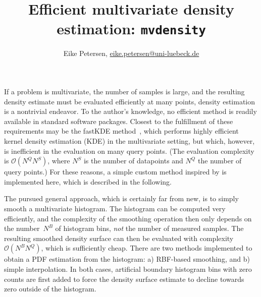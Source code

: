 \documentclass{scrarticle}
\author{Eike Petersen, \href{mailto:eike.petersen@uni-luebeck.de}{eike.petersen@uni-luebeck.de}}
\title{Efficient multivariate density estimation: \texttt{mvdensity}}
\newcommand*{\nquery}{N^Q}
\newcommand*{\nbin}{N^B}
\newcommand*{\nsample}{N^S}
\begin{document}
	
	\maketitle
	
	If a problem is multivariate, the number of samples is large, and the resulting density estimate must be evaluated efficiently at many points, density estimation is a nontrivial endeavor. 
	To the author's knowledge, no efficient method is readily available in standard software packages.
	Closest to the fulfillment of these requirements may be the fastKDE method~\cite{OBrien2016}, which performs highly efficient kernel density estimation (KDE) in the multivariate setting, but which, however, is inefficient in the evaluation on many query points.
	(The evaluation complexity is $\mathcal{O}(\nquery\nsample)$, where $\nsample$ is the number of datapoints and $\nquery$ the number of query points.)
	For these reasons, a simple custom method inspired by \textcite{Allison1993} is implemented here, which is described in the following.
	
	The pursued general approach, which is certainly far from new, is to simply smooth a multivariate histogram.
	The histogram can be computed very efficiently, and the complexity of the smoothing operation then only depends on the number~$\nbin$ of histogram bins, \emph{not} the number of measured samples.
	The resulting smoothed density surface can then be evaluated with complexity $\mathcal{O}(\nbin \nquery)$, which is sufficiently cheap.
	There are two methods implemented to obtain a PDF estimation from the histogram: a) RBF-based smoothing, and b) simple interpolation.
	In both cases, artificial boundary histogram bins with zero counts are first added to force the density surface estimate to decline towards zero outside of the histogram.
	
\end{document}
